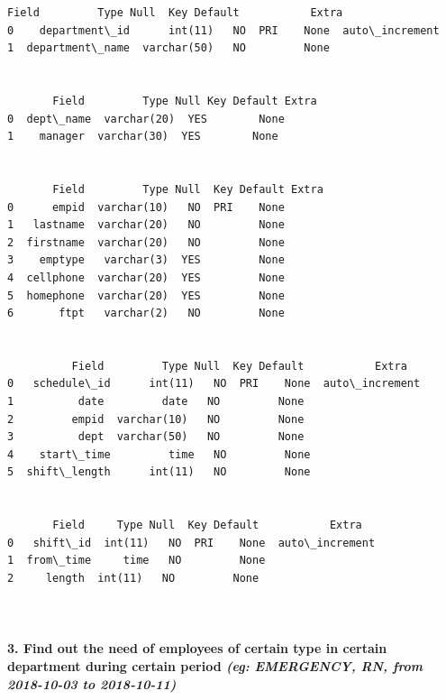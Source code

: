 \documentclass[11pt]{article}
\begin{document}
    \begin{Verbatim}[commandchars=\\\{\}]
             Field         Type Null  Key Default           Extra
0    department\_id      int(11)   NO  PRI    None  auto\_increment
1  department\_name  varchar(50)   NO         None                


       Field         Type Null Key Default Extra
0  dept\_name  varchar(20)  YES        None      
1    manager  varchar(30)  YES        None      


       Field         Type Null  Key Default Extra
0      empid  varchar(10)   NO  PRI    None      
1   lastname  varchar(20)   NO         None      
2  firstname  varchar(20)   NO         None      
3    emptype   varchar(3)  YES         None      
4  cellphone  varchar(20)  YES         None      
5  homephone  varchar(20)  YES         None      
6       ftpt   varchar(2)   NO         None      


          Field         Type Null  Key Default           Extra
0   schedule\_id      int(11)   NO  PRI    None  auto\_increment
1          date         date   NO         None                
2         empid  varchar(10)   NO         None                
3          dept  varchar(50)   NO         None                
4    start\_time         time   NO         None                
5  shift\_length      int(11)   NO         None                


       Field     Type Null  Key Default           Extra
0   shift\_id  int(11)   NO  PRI    None  auto\_increment
1  from\_time     time   NO         None                
2     length  int(11)   NO         None                



    \end{Verbatim}
    
    

    \paragraph{\texorpdfstring{3. Find out the need of employees of certain
type in certain department during certain period \emph{(eg: EMERGENCY,
RN, from 2018-10-03 to
2018-10-11)}}{3. Find out the need of employees of certain type in certain department during certain period (eg: EMERGENCY, RN, from 2018-10-03 to 2018-10-11)}}\label{find-out-the-need-of-employees-of-certain-type-in-certain-department-during-certain-period-eg-emergency-rn-from-2018-10-03-to-2018-10-11}
\end{document}

